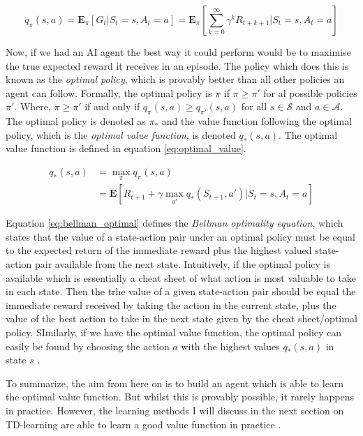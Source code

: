\documentclass[../dissertation.tex]{subfiles}
\begin{document}
\begin{equation}
\label{eq:value_function}
q_\pi(s, a) = \mathbf{E}_\pi[G_t | S_t = s, A_t = a] = \mathbf{E}_\pi [\sum_{k=0}^{\infty} \gamma^k R_{t+k+1} | S_t = s, A_t = a]
\end{equation}

Now, if we had an AI agent the best way it could perform would be to maximise the true expected reward it receives in an episode. The policy which does this is known as the \textit{optimal policy}, which is provably better than all other policies an agent can follow. Formally, the optimal policy is $\pi$ if $\pi \geq \pi'$ for al possible policies $\pi'$. Where, $\pi \geq \pi'$ if and only if $q_\pi(s,a) \geq q_{\pi'}(s,a)$ for all $s \in \mathcal{S}$ and $a \in \mathcal{A}$. The optimal policy is denoted as $\pi_*$ and the value function following the optimal policy, which is the \textit{optimal value function}, is denoted $q_*(s,a)$. The optimal value function is defined in equation \ref{eq:optimal_value}.

\begin{align}
q_*(s,a) & = \max_\pi q_\pi(s,a) \label{eq:optimal_value} \\
 & = \mathbf{E}[R_{t+1} + \gamma \max_{a'} q_* (S_{t+1}, a') | S_t = s, A_t = a]  \label{eq:bellman_optimal}
\end{align}

Equation \ref{eq:bellman_optimal} defines the \textit{Bellman optimality equation}, which states that the value of a state-action pair under an optimal policy must be equal to the expected return of the immediate reward plus the highest valued state-action pair available from the next state. Intuitively, if the optimal policy is available which is essentially a cheat sheet of what action is most valuable to take in each state. Then the trhe value of a given state-action pair should be equal the immediate reward received by taking the action in the current state, plus the value of the best action to take in the next state given by the cheat sheet/optimal policy. SImilarly, if we have the optimal value function, the optimal policy can easily be found by choosing the action $a$ with the highest values $q_*(s,a)$  in state $s$ \cite{sutton2011reinforcement}. 

To summarize, the aim from here on is to build an agent which is able to learn the optimal value function. But whilst this is provably possible, it rarely happens in practice. However, the learning methods I will discuss in the next section on TD-learning are able to learn a good value function in practice \cite{sutton1996generalization, konidaris2011value, uther1998tree, mnih2013playing}.
\end{document}
